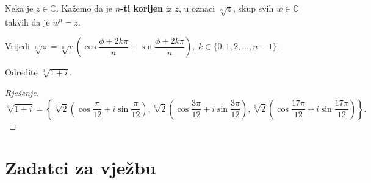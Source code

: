 \begin{definition}
Neka je $z\in \mathbb{C}$. Kažemo da je \textbf{$n$-ti korijen} iz $z$, u oznaci $\sqrt[n]{z}$, skup svih $w\in \mathbb{C}$ takvih da je $w^n=z$.
\end{definition}

\begin{remark}
Vrijedi $\sqrt[n]{z}=\sqrt[n]{r}\left(\cos{\dfrac{\phi+2k\pi}{n}}+\sin{\dfrac{\phi+2k\pi}{n}}\right), \; k\in\{0, 1, 2, \dots, n-1\}$.
\end{remark}

\begin{exercise}
Odredite $\sqrt[3]{1+i}$.
\end{exercise}
\begin{proof}[Rješenje]
$$\sqrt[3]{1+i}=\left\{\sqrt[6]{2}\left(\cos{\dfrac{\pi}{12}}+i\sin{\dfrac{\pi}{12}}\right), \sqrt[6]{2}\left(\cos{\dfrac{3\pi}{12}}+i\sin{\dfrac{3\pi}{12}}\right), \sqrt[6]{2}\left(\cos{\dfrac{17\pi}{12}}+i\sin{\dfrac{17\pi}{12}}\right)\right\}.$$
\end{proof}
\newpage
\section*{Zadatci za vježbu}
